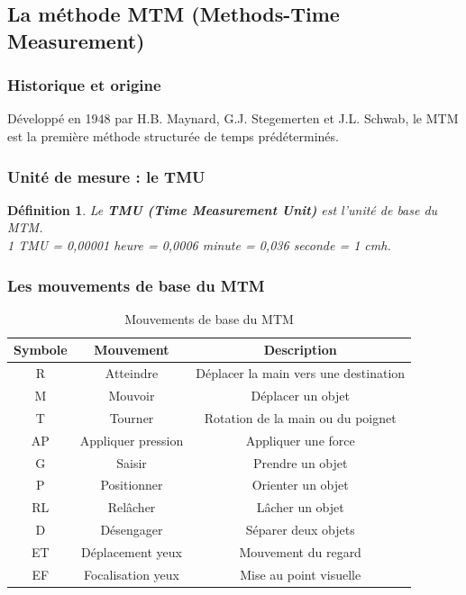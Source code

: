 \documentclass[a4paper,12pt]{article}
\newtheorem{definition}{Définition}[section]
\begin{document}
\subsection{La méthode MTM (Methods-Time Measurement)}

\subsubsection{Historique et origine}

Développé en 1948 par H.B. Maynard, G.J. Stegemerten et J.L. Schwab, le MTM est la première méthode structurée de temps prédéterminés.

\subsubsection{Unité de mesure : le TMU}

\begin{definition}
Le \textbf{TMU (Time Measurement Unit)} est l'unité de base du MTM. \\
1 TMU = 0,00001 heure = 0,0006 minute = 0,036 seconde = 1 cmh.
\end{definition}

\subsubsection{Les mouvements de base du MTM}

\begin{table}[ht]
\centering
\begin{tabular}{|c|c|c|}
\hline
\textbf{Symbole} & \textbf{Mouvement} & \textbf{Description} \\
\hline
R & Atteindre & Déplacer la main vers une destination \\
M & Mouvoir & Déplacer un objet \\
T & Tourner & Rotation de la main ou du poignet \\
AP & Appliquer pression & Appliquer une force \\
G & Saisir & Prendre un objet \\
P & Positionner & Orienter un objet \\
RL & Relâcher & Lâcher un objet \\
D & Désengager & Séparer deux objets \\
ET & Déplacement yeux & Mouvement du regard \\
EF & Focalisation yeux & Mise au point visuelle \\
\hline
\end{tabular}
\caption{Mouvements de base du MTM}
\end{table}
\end{document}
